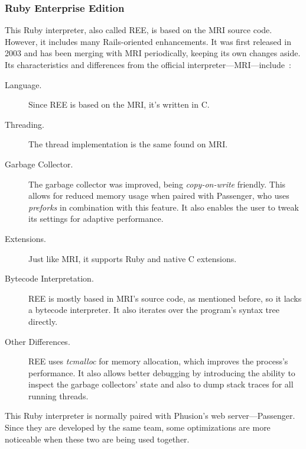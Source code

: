 \subsubsection{Ruby Enterprise Edition}
This Ruby interpreter, also called REE, is based on the MRI source code. However, it includes many Rails-oriented enhancements. It was first released in 2003 and has been merging with MRI periodically, keeping its own changes aside. Its characteristics and differences from the official interpreter---MRI---include~\cite{rubyenterpriseedition}:
\begin{description}
\item[Language.] Since REE is based on the MRI, it's written in C.
\item[Threading.] The thread implementation is the same found on MRI.
\item[Garbage Collector.]  The garbage collector was improved, being \textit{copy-on-write} friendly. This allows for reduced memory usage when paired with Passenger, who uses \textit{preforks} in combination with this feature.  It also enables the user to tweak its settings for adaptive performance.
\item[Extensions.]  Just like MRI, it supports Ruby and native C extensions. 
\item[Bytecode Interpretation.] REE is mostly based in MRI's source code, as mentioned before, so it lacks a bytecode interpreter. It also iterates over the program's syntax tree directly.
\item[Other Differences.] REE uses \textit{tcmalloc} for memory allocation, which improves the process's performance. It also allows better debugging by introducing the ability to inspect the garbage collectors' state and also to dump stack traces for all running threads.
 \end{description}
This Ruby interpreter is normally paired with Phusion's web server---Passenger. Since they are developed by the same team, some optimizations are more noticeable when these two are being used together.


